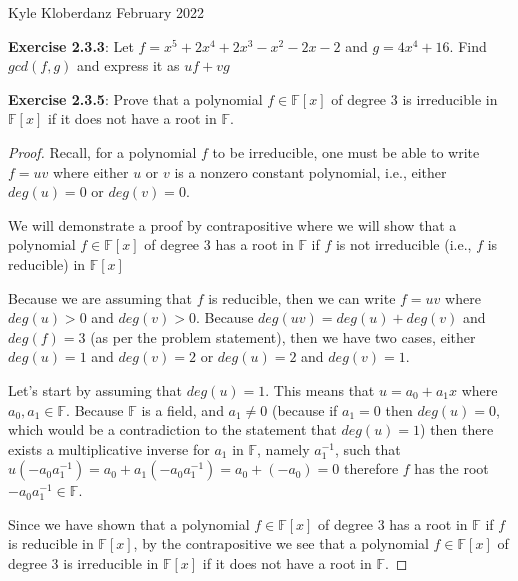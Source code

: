 \documentclass[a4paper]{article}
\begin{document}
\begin{myparindent}{0pt}

Kyle Kloberdanz  February 2022 \newline

\textbf{Exercise 2.3.3}:
Let $f = x^5 + 2x^4 + 2x^3 - x^2 - 2x - 2$ and $g = 4x^4 + 16$. Find $gcd(f, g)$
and express it as $uf + vg$
\newline

\textbf{Exercise 2.3.5}:
Prove that a polynomial $f \in \mathbb{F}[x]$ of degree 3 is irreducible in
$\mathbb{F}[x]$ if it does not have a root in $\mathbb{F}$.
\newline
\begin{proof}
  Recall, for a polynomial $f$ to be irreducible, one must be able to write
  $f = uv$ where either $u$ or $v$ is a nonzero constant polynomial, i.e.,
  either $deg(u) = 0$ or $deg(v) = 0$. \newline

  We will demonstrate a proof by contrapositive where we will show that a
  polynomial $f \in \mathbb{F}[x]$ of degree 3 has
  a root in $\mathbb{F}$ if $f$ is not irreducible (i.e., $f$ is reducible) in
  $\mathbb{F}[x]$
  \newline

  Because we are assuming that $f$ is reducible, then we can write $f = uv$
  where $deg(u) > 0$ and $deg(v) > 0$. Because $deg(uv) = deg(u) + deg(v)$ and
  $deg(f) = 3$ (as per the problem statement), then we have two cases, either
  $deg(u) = 1$ and $deg(v) = 2$ or $deg(u) = 2$ and $deg(v) = 1$. \newline

  Let's start by assuming that $deg(u) = 1$. This means that $u = a_0 + a_1x$
  where $a_0, a_1 \in \mathbb{F}$. Because $\mathbb{F}$ is a field, and
  $a_1 \neq 0$ (because if $a_1 = 0$ then $deg(u) = 0$, which would be a
  contradiction to the statement that $deg(u) = 1$)
  then there
  exists a multiplicative inverse for $a_1$ in $\mathbb{F}$, namely
  $a_1^{-1}$, such that $u(-a_0a_1^{-1}) = a_0 + a_1(-a_0a_1^{-1}) = a_0 + (-a_0) = 0$
  therefore $f$ has the root $-a_0a_1^{-1} \in \mathbb{F}$. \newline

  Since we have shown that a polynomial $f \in \mathbb{F}[x]$ of degree 3 has a
  root in $\mathbb{F}$ if $f$ is reducible in $\mathbb{F}[x]$, by the
  contrapositive we see that a polynomial $f \in \mathbb{F}[x]$ of degree 3 is
  irreducible in $\mathbb{F}[x]$ if it does not have a root in $\mathbb{F}$.
\end{proof}


\end{myparindent}
\end{document}

